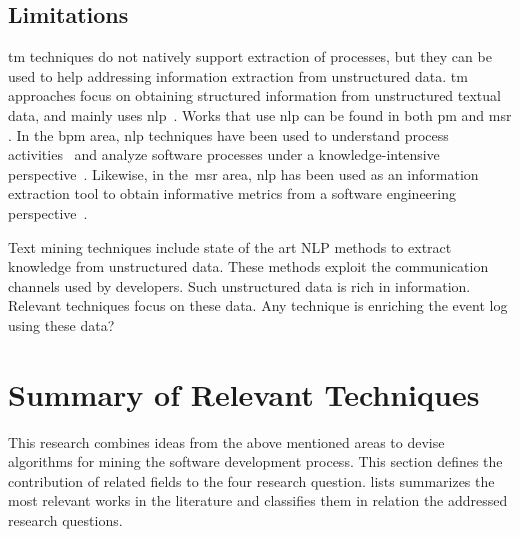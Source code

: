 \subsection{Limitations}
\Gls{tm} techniques do not natively support extraction of processes, but they can be used to help addressing information extraction from unstructured data. \Gls{tm} approaches focus on obtaining structured information from unstructured textual data, and mainly uses \gls{nlp}~\citep{Witten:1999}. Works that use \gls{nlp} can be found in both \gls{pm} \citep{VanderAalst2016b} and \gls{msr} \citep{Chen2016a}. In the \gls{bpm} \citep{Dumas2018} area, \gls{nlp} techniques have been used to understand process activities~\citep{Leopold2013,Mendling2014} and analyze software processes under a knowledge-intensive perspective~\citep{DeA.R.Goncalves2011,Richetti2017}. Likewise, in the~\gls{msr} area, \gls{nlp} has been used as an information extraction tool to obtain informative metrics from a software engineering perspective~\citep{Thomas2014,Chen2016a}. 


Text mining techniques include state of the art NLP methods to extract knowledge from unstructured data. These methods exploit the communication channels used by developers. Such unstructured data is rich in information. 
Relevant techniques focus on these data.
Any technique is enriching the event log using these data?

\section{Summary of Relevant Techniques}
\label{sec:summary-of-relevant-techniques}


This research combines ideas from the above mentioned areas to devise algorithms for mining the software development process. This section defines the contribution of related fields to the four research question.  lists summarizes the most relevant works in the literature and classifies them in relation the addressed research questions.



